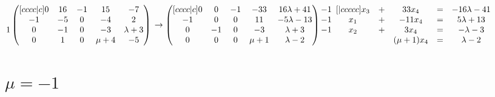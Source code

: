 \documentclass{article}
\begin{document}
\begin{math}
\begin{matrix}
          ~\\
          1
        \end{matrix}
        \begin{pmatrix}[cccc|c]
             0 & 16 & -1 & 15 & -7\\
             -1 & -5 & 0 & -4 & 2\\
             0 & -1 & 0 & -3 & \lambda + 3\\
             0 & 1 & 0 & \mu + 4 & -5
        \end{pmatrix}\\
        \\
        \\
        \to
        \begin{pmatrix}[cccc|c]
             0 & 0 & -1 & -33 & 16\lambda + 41\\
             -1 & 0 & 0 & 11 & -5\lambda - 13\\
             0 & -1 & 0 & -3 & \lambda + 3\\
             0 & 0 & 0 & \mu + 1 & \lambda - 2
        \end{pmatrix}
        \begin{matrix}
          -1\\
          -1\\
          -1\\
          ~
        \end{matrix}
        \\
        \\
        \\
        \begin{matrix}[|ccccc]
            x_3 & + & 33x_4 & = & -16\lambda - 41\\
            x_1 & + & -11x_4 & = & 5\lambda + 13\\
            x_2 & + & 3x_4 & = & -\lambda - 3\\
            ~ & ~ & (\mu + 1)x_4 & = & \lambda - 2\\
        \end{matrix}
    \end{math}
    \section{\(\mu = -1\)}
\end{document}
